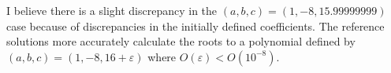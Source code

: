 \documentclass{article}
\theoremstyle{definition}
\theoremstyle{remark}
\begin{document}
\begin{enumerate}
\begin{enumerate}
        I believe there is a slight discrepancy in the \((a,b,c) = (1,-8,15.99999999)\) case because of discrepancies in the initially defined coefficients. The reference solutions more accurately calculate the roots to a polynomial defined by \((a,b,c) = (1,-8,16+\varepsilon)\) where \(O(\varepsilon) < O(10^{-8})\).
    \end{enumerate}

\end{enumerate}
\end{document}
